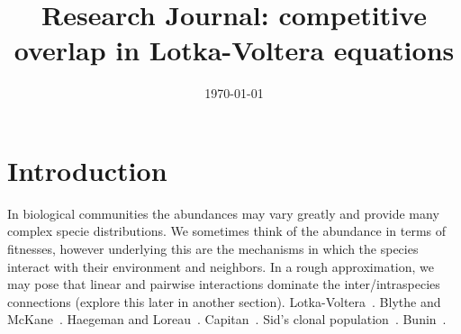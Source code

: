 \documentclass[11pt,a4paper,final]{iopart}
\begin{document}
\title[Research Journal: Competitive Overlap]{Research Journal: competitive overlap in Lotka-Voltera equations}
\date{\today}

\iffalse
\author{Jeremy Rothschild$^1$}
\address{$^1$University of Toronto, Toronto}

\ead{rothschild@physics.utoronto.ca}

\author{Author Two}
\address{Address Three, Neverland}
\ead{author.two@mail.com}

\author[cor1]{Author Three}
\address{Address Four, Neverland}
\eads{\mailto{author.three@mail.com}, \mailto{author.three@gmail.com}}


\begin{abstract}
This document describes the  preparation of an article using \LaTeXe\ and 
\verb"iopart.cls" (the IOP \LaTeXe\ preprint class file).
This class file is designed to help 
authors produce preprints in a form suitable for submission to any of the
journals published by IOP Publishing.
Authors submitting to any IOP journal, i.e.\ 
both single- and double-column ones, should follow the guidelines set out here. 
On acceptance, their TeX code will be converted to 
the appropriate format for the journal concerned.

\end{abstract}

\vspace{2pc}
\noindent{\it Keywords}: Article preparation, IOP journals
\submitto{\JPA}
\fi

\section{Introduction}

In biological communities the abundances may vary greatly and provide many complex specie distributions. 
We sometimes think of the abundance in terms of fitnesses, however underlying this are the mechanisms in which the species interact with their environment and neighbors. 
In a rough approximation, we may pose that linear and pairwise interactions dominate the inter/intraspecies connections (explore this later in another section). 
Lotka-Voltera~\cite{ref1,ref2,ref3}. 
Blythe and McKane~\cite{ref4,ref5,ref6}. 
Haegeman and Loreau~\cite{ref7}. 
Capitan~\cite{ref8,ref9}. 
Sid's clonal population~\cite{ref10}. 
Bunin~\cite{ref11}.
\end{document}
